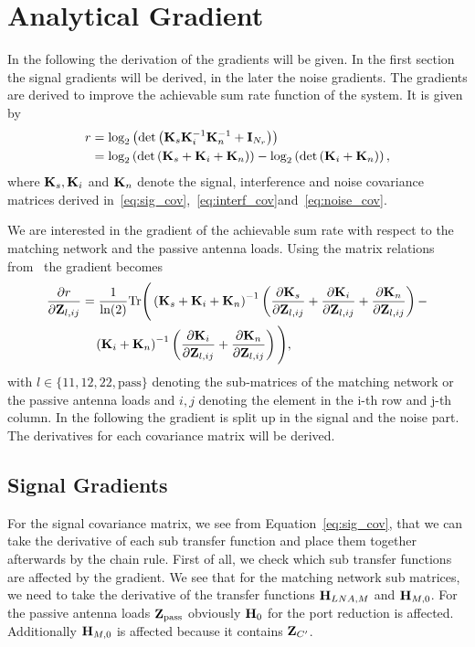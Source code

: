 \chapter{Analytical Gradient}

In the following the derivation of the gradients will be given.
In the first section the signal gradients will be derived, in the later the noise gradients.
The gradients are derived to improve the achievable sum rate function of the system.
It is given by
\begin{align}
\label{eq:sum_rate}
r &= \text{log}_2\left(\text{det}\left(
		\mathbf{K}_s\mathbf{K}_i^{-1}\mathbf{K}_n^{-1} + \mathbf{I}_{N_r}\right)\right)\\\nonumber 
&= \text{log}_2\left(\text{det}\left(
		\mathbf{K}_s+\mathbf{K}_i+\mathbf{K}_n\right)\right) -
		\text{log}_2\left(\text{det}\left(\mathbf{K}_i+\mathbf{K}_n\right)\right),
\end{align}
where $\mathbf{K}_s, \mathbf{K}_i$ and $\mathbf{K}_n$ denote the signal, interference and noise covariance matrices derived in~\eqref{eq:sig_cov},~\eqref{eq:interf_cov}and~\eqref{eq:noise_cov}.

We are interested in the gradient of the achievable sum rate with respect to the matching network and the passive antenna loads.
Using the matrix relations from~\cite{Codebook12} the gradient becomes
\begin{align}
\label{eq:gradient}\nonumber
\frac{\partial r}{\partial\mathbf{Z}_{l,ij}} &= \frac{1}{\text{ln}(2)} 
\text{Tr}\Bigg(\left(\mathbf{K}_s + \mathbf{K}_i + \mathbf{K}_n\right)^{-1}
\left(\frac{\partial\mathbf{K}_s}{\partial\mathbf{Z}_{l,ij}}+
 \frac{\partial\mathbf{K}_i}{\partial\mathbf{Z}_{l,ij}}+
 \frac{\partial\mathbf{K}_n}{\partial\mathbf{Z}_{l,ij}}\right)-\\
 &\quad\left(\mathbf{K}_i+\mathbf{K}_n\right)^{-1}
 \left(\frac{\partial\mathbf{K}_i}{\partial\mathbf{Z}_{l,ij}}+
 	\frac{\partial\mathbf{K}_n}{\partial\mathbf{Z}_{l,ij}}\right)\Bigg),
\end{align}
with $l\in\{11,12,22,\text{pass}\}$ denoting the sub-matrices of the matching network or the passive antenna loads and $i,j$ denoting the element in the i-th row and j-th column.
In the following the gradient is split up in the signal and the noise part.
The derivatives for each covariance matrix will be derived.

\section{Signal Gradients}
\label{sec:signal_gradient}
 For the signal covariance matrix, we see from Equation~\eqref{eq:sig_cov}, that we can take the derivative of each sub transfer function and place them together afterwards by the chain rule.
First of all, we check which sub transfer functions are affected by the gradient.
We see that for the matching network sub matrices, we need to take the derivative of the transfer functions $\mathbf{H}_{LNA,M}$ and $\mathbf{H}_{M,0}$.
For the passive antenna loads $\mathbf{Z}_\text{pass}$ obviously $\mathbf{H}_{0}$ for the port reduction is affected.
Additionally $\mathbf{H}_{M,0}$ is affected because it contains $\mathbf{Z}_{C'}$.

